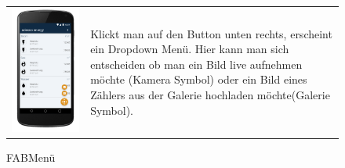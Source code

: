 \begin{figure}[h]
\begin{tabularx}{\textwidth}{X  X}
	\includegraphics[scale = 0.155]{img/AndroidMockup/FABMenu} \caption{FABMenü}  & Klickt man auf den Button unten rechts, erscheint ein Dropdown Menü. Hier kann man sich entscheiden ob man ein Bild live aufnehmen möchte (Kamera Symbol) oder ein Bild eines Zählers aus der Galerie hochladen möchte(Galerie Symbol). \\

\end{tabularx}
\end{figure}
